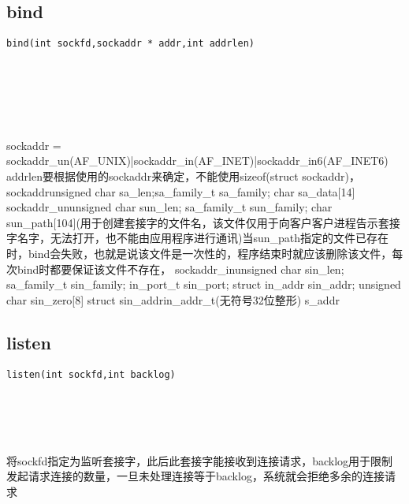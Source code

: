 \documentclass[10pt,a4paper]{article}
\begin{document}
\subsection{bind}
\begin{spacing}{2.0}
\lstset{language=C,numbers=none}
\begin{lstlisting}
bind(int sockfd,sockaddr * addr,int addrlen)
\end{lstlisting}
{\large\color[rgb]{0.2,0.4,0.6}{sockfd:}} \\
{\large\color[rgb]{0.2,0.4,0.6}{addr:}} \\
{\large\color[rgb]{0.2,0.4,0.6}{addrlen:}}
\paragraph{ \ \ }sockaddr = sockaddr\_un(AF\_UNIX)|sockaddr\_in(AF\_INET)|sockaddr\_in6(AF\_INET6) addrlen要根据使用的sockaddr来确定，不能使用sizeof(struct sockaddr)，sockaddr{unsigned char sa\_len;sa\_family\_t sa\_family; char sa\_data[14]} sockaddr\_un{unsigned char sun\_len; sa\_family\_t sun\_family; char sun\_path[104](用于创建套接字的文件名，该文件仅用于向客户客户进程告示套接字名字，无法打开，也不能由应用程序进行通讯)}当sun\_path指定的文件已存在时，bind会失败，也就是说该文件是一次性的，程序结束时就应该删除该文件，每次bind时都要保证该文件不存在， sockaddr\_in{unsigned char sin\_len; sa\_family\_t sin\_family; in\_port\_t sin\_port; struct in\_addr sin\_addr; unsigned char sin\_zero[8]} struct sin\_addr{in\_addr\_t(无符号32位整形) s\_addr}
\end{spacing}

\subsection{listen}
\begin{spacing}{2.0}
\lstset{language=C,numbers=none}
\begin{lstlisting}
listen(int sockfd,int backlog)
\end{lstlisting}
{\large\color[rgb]{0.2,0.4,0.6}{sockfd:}} \\
{\large\color[rgb]{0.2,0.4,0.6}{backlog:}}
\paragraph{ \ \ }将sockfd指定为监听套接字，此后此套接字能接收到连接请求，backlog用于限制发起请求连接的数量，一旦未处理连接等于backlog，系统就会拒绝多余的连接请求
\end{spacing}
\end{document}
